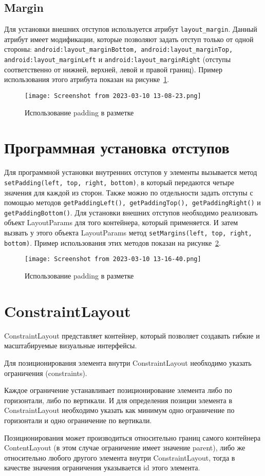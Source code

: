 \subsection{Margin}
Для установки внешних отступов используется атрибут \texttt{layout\_margin}.
Данный атрибут имеет модификации, которые позволяют задать отступ
только от одной стороны: \texttt{android:layout\_marginBottom,
android:layout\_marginTop, android:layout\_marginLeft} и
\texttt{android:layout\_marginRight} (отступы соответственно от нижней,
верхней, левой и правой границ).
Пример использования этого атрибута показан на рисунке~\ref{fig:xml:margin}.

\begin{figure}[h!tp]
	\centering
	\texttt{[image: Screenshot from 2023-03-10 13-08-23.png]}
	\caption{Использование padding в разметке}
	\label{fig:xml:margin}
\end{figure}

\section{Программная установка отступов}
Для программной установки внутренних отступов у элементы вызывается
метод \texttt{setPadding(left, top, right, bottom)},
в который передаются четыре значения для каждой из сторон.
Также можно по отдельности задать отступы с помощью методов
\texttt{getPaddingLeft(), getPaddingTop(), getPaddingRight()} и
\texttt{getPaddingBottom()}.
Для установки внешних отступов необходимо реализовать объект
LayoutParams для того контейнера, который применяется.
И затем вызвать у этого объекта LayoutParams метод
\texttt{setMargins(left, top, right, bottom)}.
Пример использования этих методов показан на рисунке~\ref{fig:java:pd:mrg}.

\begin{figure}[h!tp]
	\centering
	\texttt{[image: Screenshot from 2023-03-10 13-16-40.png]}
	\caption{Использование padding в разметке}
	\label{fig:java:pd:mrg}
\end{figure}

\section{ConstraintLayout}
ConstraintLayout представляет контейнер, который позволяет создавать
гибкие и масштабируемые визуальные интерфейсы.\par
Для позиционирования элемента внутри ConstraintLayout необходимо указать
ограничения (constraints).\par
Каждое ограничение устанавливает позиционирование элемента либо по
горизонтали, либо по вертикали. И для определения позиции элемента в
ConstraintLayout необходимо указать как минимум одно ограничение по
горизонтали и одно ограничение по вертикали.\par
Позиционирования может производиться относительно границ самого
контейнера ContentLayout (в этом случае ограничение имеет значение parent),
либо же относительно любого другого элемента внутри ConstraintLayout,
тогда в качестве значения ограничения указывается id этого элемента.\par

